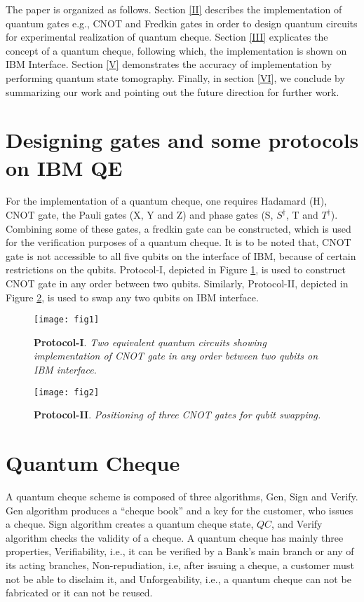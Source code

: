 \documentclass[aps,pra,twocolumn,groupedaddress,showpacs,showkeys]{revtex4-1}
\begin{document}
The paper is organized as follows. Section \ref{II} describes the implementation of quantum gates e.g., CNOT and Fredkin gates in order to design quantum circuits for experimental realization of quantum cheque. Section \ref{III} explicates the concept of a quantum cheque, following which, the implementation is shown on IBM Interface. Section \ref{V} demonstrates the accuracy of implementation by performing quantum state tomography. Finally, in section \ref{VI}, we conclude by summarizing our work and pointing out the future direction for further work.   

\section{Designing gates and some protocols on IBM QE \label{II}}
  
For the implementation of a quantum cheque, one requires Hadamard (H), CNOT gate, the Pauli gates (X, Y and Z) and phase gates (S, $S^{\dagger}$, T and $T^{\dagger}$). Combining some of these gates, a fredkin gate can be constructed, which is used for the verification purposes of a quantum cheque. It is to be noted that, CNOT gate is not accessible to all five qubits on the interface of IBM, because of certain restrictions on the qubits. Protocol-I, depicted in Figure \ref{figI}, is used to construct CNOT gate in any order between two qubits. Similarly, Protocol-II, depicted in Figure \ref{figII}, is used to swap any two qubits on IBM interface. 

\begin{figure}[h]
    \centering
    \texttt{[image: fig1]}
    \caption{\textbf{Protocol-I}. \emph{Two equivalent quantum circuits showing implementation of CNOT gate in any order between two qubits on IBM interface.}}
     \label{figI}
\end{figure}

\begin{figure}[h]
     \centering
    \texttt{[image: fig2]}
    \caption{\textbf{Protocol-II}. \emph{Positioning of three CNOT gates for qubit swapping.}}
    \label{figII}
\end{figure}
 
\section{Quantum Cheque \label{III}} 
A quantum cheque scheme is composed of three algorithms, Gen, Sign and Verify. Gen algorithm produces a \enquote{cheque book} and a key for the customer, who issues a cheque. Sign algorithm creates a quantum cheque state, $QC$, and Verify algorithm checks the validity of a cheque. A quantum cheque has mainly three properties, Verifiability, i.e., it can be verified by a Bank's main branch or any of its acting branches, Non-repudiation, i.e, after issuing a cheque, a customer must not be able to disclaim it, and Unforgeability, i.e., a quantum cheque can not be fabricated or it can not be reused. 
\end{document}
